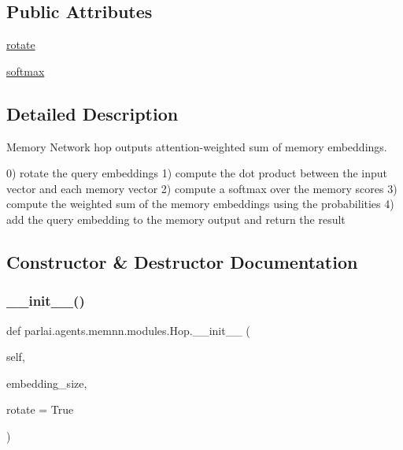 \subsection*{Public Attributes}
\begin{DoxyCompactItemize}
\item 
\hyperlink{classparlai_1_1agents_1_1memnn_1_1modules_1_1Hop_a88857c10815bc48ef24c78ecf367935d}{rotate}
\item 
\hyperlink{classparlai_1_1agents_1_1memnn_1_1modules_1_1Hop_a50d4a5a4bd188efc2944d68c0761cc0a}{softmax}
\end{DoxyCompactItemize}


\subsection{Detailed Description}
\begin{DoxyVerb}Memory Network hop outputs attention-weighted sum of memory embeddings.

0) rotate the query embeddings 1) compute the dot product between the input vector
and each memory vector 2) compute a softmax over the memory scores 3) compute the
weighted sum of the memory embeddings using the probabilities 4) add the query
embedding to the memory output and return the result
\end{DoxyVerb}
 

\subsection{Constructor \& Destructor Documentation}
\mbox{\label{classparlai_1_1agents_1_1memnn_1_1modules_1_1Hop_aa38fc63425e2968ae2530edd6b37ad1a}} 
\subsubsection{\texorpdfstring{\+\_\+\+\_\+init\+\_\+\+\_\+()}{\_\_init\_\_()}}
{\footnotesize\ttfamily def parlai.\+agents.\+memnn.\+modules.\+Hop.\+\_\+\+\_\+init\+\_\+\+\_\+ (\begin{DoxyParamCaption}\item[{}]{self,  }\item[{}]{embedding\+\_\+size,  }\item[{}]{rotate = {\ttfamily True} }\end{DoxyParamCaption})}

